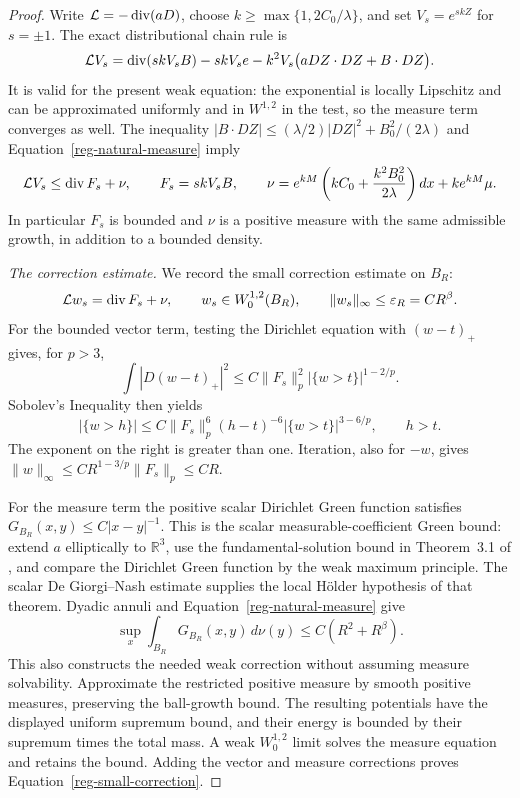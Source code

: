 \begin{proof}
Write $\mathcal L=-\operatorname{div}(aD)$, choose
$k\ge\max\{1,2C_0/\lambda\}$, and set $V_s=e^{skZ}$ for
$s=\pm1$. The exact distributional chain rule is
\begin{equation}
 \mathcal LV_s
  =\operatorname{div}(skV_sB)-skV_se
    -k^2V_s\bigl(aDZ\cdot DZ+B\cdot DZ\bigr).
 \label{reg-exponential-identity}
\end{equation}
It is valid for the present weak equation: the exponential is
locally Lipschitz and can be approximated uniformly and in
$W^{1,2}$ in the test, so the measure term converges as well.
The inequality
$|B\cdot DZ|\le(\lambda/2)|DZ|^2+B_0^2/(2\lambda)$ and
Equation~\eqref{reg-natural-measure} imply
\begin{equation}
 \mathcal LV_s\le\operatorname{div} F_s+\nu,
 \qquad F_s=skV_sB,
 \qquad
 \nu=e^{kM}\left(kC_0+\frac{k^2B_0^2}{2\lambda}\right)dx
                     +ke^{kM}\mu.
 \label{reg-exponential-subsolution}
\end{equation}
In particular $F_s$ is bounded and $\nu$ is a positive measure
with the same admissible growth, in addition to a bounded density.

\emph{The correction estimate.}
We record the small correction estimate on $B_R$:
\begin{equation}
 \mathcal Lw_s=\operatorname{div} F_s+\nu,
 \qquad w_s\in W^{1,2}_0(B_R),
 \qquad \|w_s\|_\infty\le\varepsilon_R=CR^\beta.
 \label{reg-small-correction}
\end{equation}
For the bounded vector term, testing the Dirichlet equation with
$(w-t)_+$ gives, for $p>3$,
\[
 \int|D(w-t)_+|^2
       \le C\|F_s\|_p^2|\{w>t\}|^{1-2/p}.
\]
Sobolev's Inequality then yields
\[
 |\{w>h\}|
 \le C\|F_s\|_p^6(h-t)^{-6}
                 |\{w>t\}|^{3-6/p},\qquad h>t.
\]
The exponent on the right is greater than one. Iteration, also
for $-w$, gives $\|w\|_\infty\le
CR^{1-3/p}\|F_s\|_p\le CR$.

For the measure term the positive scalar Dirichlet Green function
satisfies $G_{B_R}(x,y)\le C|x-y|^{-1}$. This is the scalar
measurable-coefficient Green bound: extend $a$ elliptically to
$\mathbb R^3$, use the fundamental-solution bound in
Theorem~3.1 of \cite{hofmannkim2007}, and compare the Dirichlet
Green function by the weak maximum principle. The scalar
De Giorgi--Nash estimate supplies the local H\"older hypothesis
of that theorem. Dyadic annuli and
Equation~\eqref{reg-natural-measure} give
\[
 \sup_x\int_{B_R}G_{B_R}(x,y)\,d\nu(y)
                  \le C(R^2+R^\beta).
\]
This also constructs the needed weak correction without assuming
measure solvability. Approximate the restricted positive measure
by smooth positive measures, preserving the ball-growth bound.
The resulting potentials have the displayed uniform supremum
bound, and their energy is bounded by their supremum times the
total mass. A weak $W^{1,2}_0$ limit solves the measure equation
and retains the bound. Adding the vector and measure corrections
proves Equation~\eqref{reg-small-correction}.


\end{proof}
